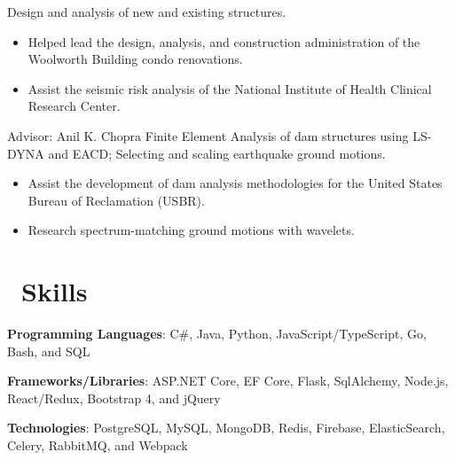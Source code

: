 \documentclass{resume}
\begin{document}
Design and analysis of new and existing structures.
\begin{itemize}
  \item Helped lead the design, analysis, and construction administration of the Woolworth Building
          condo renovations. 
  \item Assist the seismic risk analysis of the National Institute of Health Clinical Research Center.
\end{itemize}

 {Advisor: Anil K. Chopra}
Finite Element Analysis of dam structures using LS-DYNA and EACD; Selecting and scaling earthquake ground motions.
\begin{itemize}
  \item Assist the development of dam analysis methodologies for the United States Bureau of
          Reclamation (USBR).
  \item Research spectrum-matching ground motions with wavelets.
\end{itemize}

\section{\faCogs\ Skills}

  \textbf{Programming Languages}: C\#, Java, Python, JavaScript/TypeScript, Go, Bash, and SQL

  
  \textbf{Frameworks/Libraries}: ASP.NET Core, EF Core, Flask, SqlAlchemy, Node.js, React/Redux, Bootstrap 4, and jQuery


  \textbf{Technologies}: PostgreSQL, MySQL, MongoDB, Redis, Firebase, ElasticSearch, Celery, RabbitMQ, and Webpack
  
 
  
\end{document}
